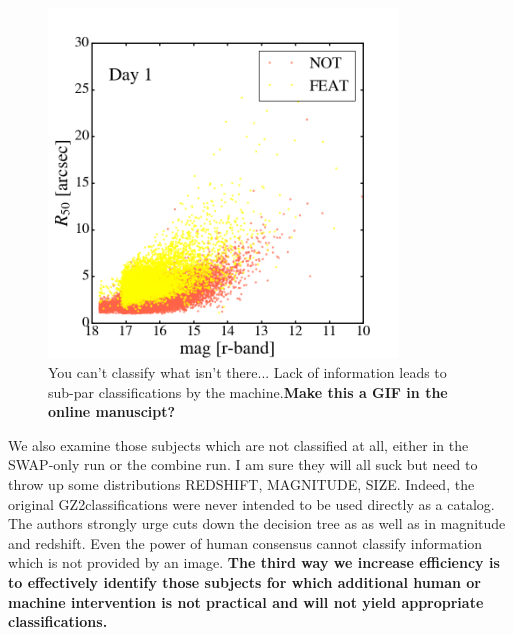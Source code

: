 \documentclass[twocolumn]{aastex6}
\begin{document}
\begin{figure}[t!]
\includegraphics[width=3.65in]{figures/GZ2_sup_PLPD5_p5_flipfeature2b_2009-02-25_00:00:00_RF_accuracy_size-mag.png}
\caption{You can't classify what isn't there... Lack of information leads to sub-par classifications by the machine.\textbf{Make this a GIF in the online manuscipt?} \label{fig: machine classified}}
\end{figure}

We also examine those subjects which are not classified at all, either in the SWAP-only
run or the combine run. I am sure they will all suck but need to throw up some distributions
REDSHIFT, MAGNITUDE, SIZE.  Indeed, the original GZ2classifications were never intended 
to be used directly as a catalog. The authors strongly urge cuts down the decision tree as
as well as in magnitude and redshift. Even the power of human consensus  cannot 
classify information which is not provided by an image. \textbf{The third way we increase 
efficiency is to effectively identify those subjects for which additional human or 
machine intervention is not practical and will not yield appropriate classifications.} 




\end{document}
